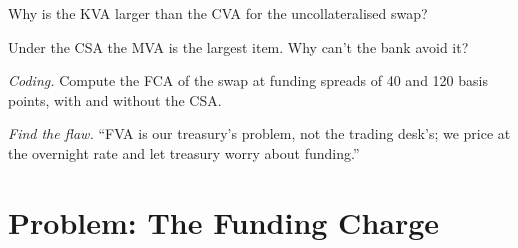 \begin{exercise}[$\star\star$]\label{exo:rc:funding-margin-and-capital-adjustments:5}
Why is the KVA larger than the CVA for the uncollateralised swap?
\end{exercise}

\begin{exercise}[$\star\star$]\label{exo:rc:funding-margin-and-capital-adjustments:6}
Under the CSA the MVA is the largest item. Why can't the bank avoid it?
\end{exercise}

\begin{exercise}[$\star\star\star$]\label{exo:rc:funding-margin-and-capital-adjustments:7}
\emph{Coding.} Compute the FCA of the swap at funding spreads of 40 and 120 basis points,
with and without the CSA.
\end{exercise}

\begin{exercise}[$\star\star\star$]\label{exo:rc:funding-margin-and-capital-adjustments:8}
\emph{Find the flaw.} ``FVA is our treasury's problem, not the trading desk's; we price at
the overnight rate and let treasury worry about funding.''
\end{exercise}

\section{Problem: The Funding Charge}

